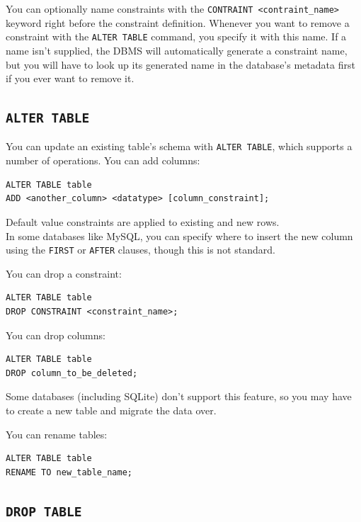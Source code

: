 \documentclass[table, xcdraw]{article}%
\begin{document}
You can optionally name constraints with the \texttt{CONTRAINT <contraint_name>} keyword right before the constraint definition. Whenever you want to remove a constraint with the \texttt{ALTER TABLE} command, you specify it with this name. If a name isn't supplied, the DBMS will automatically generate a constraint name, but you will have to look up its generated name in the database's metadata first if you ever want to remove it.

\subsection{\texttt{ALTER TABLE}}

You can update an existing table's schema with \texttt{ALTER TABLE}, which supports a number of operations. You can add columns:

\begin{verbatim}
ALTER TABLE table
ADD <another_column> <datatype> [column_constraint];
\end{verbatim}

Default value constraints are applied to existing and new rows.\\
In some databases like MySQL, you can specify where to insert the new column using the \texttt{FIRST} or \texttt{AFTER} clauses, though this is not standard.

You can drop a constraint:

\begin{verbatim}
ALTER TABLE table
DROP CONSTRAINT <constraint_name>; 
\end{verbatim}

You can drop columns:

\begin{verbatim}
ALTER TABLE table
DROP column_to_be_deleted;
\end{verbatim}

Some databases (including SQLite) don't support this feature, so you may have to create a new table and migrate the data over.

You can rename tables:

\begin{verbatim}
ALTER TABLE table
RENAME TO new_table_name;
\end{verbatim}

\subsection{\texttt{DROP TABLE}}
\end{document}
